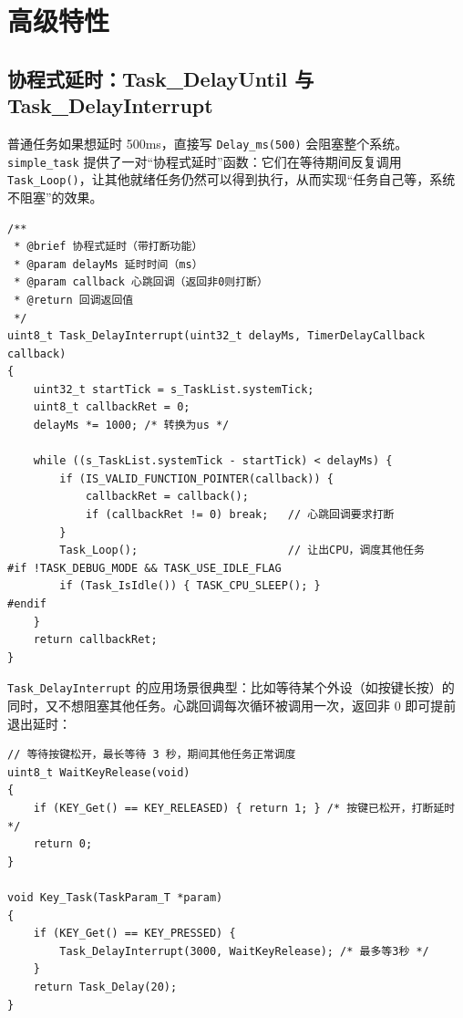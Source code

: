 \section{高级特性}

\subsection{协程式延时：Task\_DelayUntil 与 Task\_DelayInterrupt}

普通任务如果想延时 500ms，直接写 \texttt{Delay\_ms(500)} 会阻塞整个系统。\texttt{simple\_task} 提供了一对“协程式延时”函数：它们在等待期间反复调用 \texttt{Task\_Loop()}，让其他就绪任务仍然可以得到执行，从而实现“任务自己等，系统不阻塞”的效果。

\begin{lstlisting}[style=c]
/**
 * @brief 协程式延时（带打断功能）
 * @param delayMs 延时时间（ms）
 * @param callback 心跳回调（返回非0则打断）
 * @return 回调返回值
 */
uint8_t Task_DelayInterrupt(uint32_t delayMs, TimerDelayCallback callback)
{
    uint32_t startTick = s_TaskList.systemTick;
    uint8_t callbackRet = 0;
    delayMs *= 1000; /* 转换为us */

    while ((s_TaskList.systemTick - startTick) < delayMs) {
        if (IS_VALID_FUNCTION_POINTER(callback)) {
            callbackRet = callback();
            if (callbackRet != 0) break;   // 心跳回调要求打断
        }
        Task_Loop();                       // 让出CPU，调度其他任务
#if !TASK_DEBUG_MODE && TASK_USE_IDLE_FLAG
        if (Task_IsIdle()) { TASK_CPU_SLEEP(); }
#endif
    }
    return callbackRet;
}
\end{lstlisting}

\texttt{Task\_DelayInterrupt} 的应用场景很典型：比如等待某个外设（如按键长按）的同时，又不想阻塞其他任务。心跳回调每次循环被调用一次，返回非 0 即可提前退出延时：

\begin{lstlisting}[style=c]
// 等待按键松开，最长等待 3 秒，期间其他任务正常调度
uint8_t WaitKeyRelease(void)
{
    if (KEY_Get() == KEY_RELEASED) { return 1; } /* 按键已松开，打断延时 */
    return 0;
}

void Key_Task(TaskParam_T *param)
{
    if (KEY_Get() == KEY_PRESSED) {
        Task_DelayInterrupt(3000, WaitKeyRelease); /* 最多等3秒 */
    }
    return Task_Delay(20);
}
\end{lstlisting}

